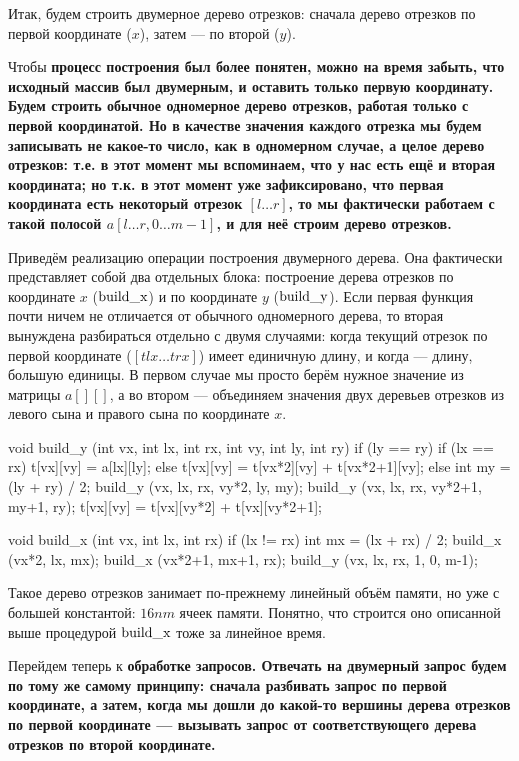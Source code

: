 Итак, будем строить двумерное дерево отрезков: сначала дерево отрезков по первой координате ($x$), затем --- по второй ($y$).

Чтобы \bf{процесс построения} был более понятен, можно на время забыть, что исходный массив был двумерным, и оставить только первую координату. Будем строить обычное одномерное дерево отрезков, работая только с первой координатой. Но в качестве значения каждого отрезка мы будем записывать не какое-то число, как в одномерном случае, а целое дерево отрезков: т.е. в этот момент мы вспоминаем, что у нас есть ещё и вторая координата; но т.к. в этот момент уже зафиксировано, что первая координата есть некоторый отрезок $[l \ldots r]$, то мы фактически работаем с такой полосой $a[l \ldots r, 0 \ldots m-1]$, и для неё строим дерево отрезков.

Приведём реализацию операции построения двумерного дерева. Она фактически представляет собой два отдельных блока: построение дерева отрезков по координате $x$ ($\rm build\_x$) и по координате $y$ ($\rm build\_y$). Если первая функция почти ничем не отличается от обычного одномерного дерева, то вторая вынуждена разбираться отдельно с двумя случаями: когда текущий отрезок по первой координате ($[tlx \ldots trx]$) имеет единичную длину, и когда --- длину, большую единицы. В первом случае мы просто берём нужное значение из матрицы $a[][]$, а во втором --- объединяем значения двух деревьев отрезков из левого сына и правого сына по координате $x$.

\code
void build_y (int vx, int lx, int rx, int vy, int ly, int ry) {
	if (ly == ry)
		if (lx == rx)
			t[vx][vy] = a[lx][ly];
		else
			t[vx][vy] = t[vx*2][vy] + t[vx*2+1][vy];
	else {
		int my = (ly + ry) / 2;
		build_y (vx, lx, rx, vy*2, ly, my);
		build_y (vx, lx, rx, vy*2+1, my+1, ry);
		t[vx][vy] = t[vx][vy*2] + t[vx][vy*2+1];
	}
}

void build_x (int vx, int lx, int rx) {
	if (lx != rx) {
		int mx = (lx + rx) / 2;
		build_x (vx*2, lx, mx);
		build_x (vx*2+1, mx+1, rx);
	}
	build_y (vx, lx, rx, 1, 0, m-1);
}
\endcode

Такое дерево отрезков занимает по-прежнему линейный объём памяти, но уже с большей константой: $16 n m$ ячеек памяти. Понятно, что строится оно описанной выше процедурой $\rm build\_x$ тоже за линейное время.

Перейдем теперь к \bf{обработке запросов}. Отвечать на двумерный запрос будем по тому же самому принципу: сначала разбивать запрос по первой координате, а затем, когда мы дошли до какой-то вершины дерева отрезков по первой координате --- вызывать запрос от соответствующего дерева отрезков по второй координате.

